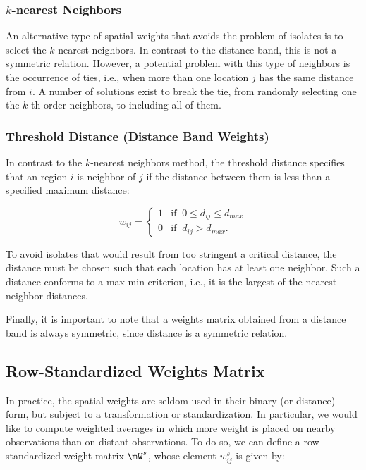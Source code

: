 \subsubsection{$k$-nearest Neighbors}

An alternative type of spatial weights that avoids the problem of isolates is to select the $k$-nearest neighbors. In contrast to the distance band, this is not a symmetric relation. However, a potential problem with this type of neighbors is the occurrence of ties, i.e., when more than one location $j$ has the same distance from $i$. A number of solutions exist to break the tie, from randomly selecting one the $k$-th order neighbors, to including all of them. 

\subsubsection{Threshold Distance (Distance Band Weights)}

In contrast to the $k$-nearest neighbors method, the threshold distance specifies that an region $i$ is neighbor of $j$ if the distance between them is less than a specified maximum distance:


\begin{equation*}
  w_{ij}= 
   \begin{cases}
      1 & \mbox{if}\;\; 0\leq d_{ij} \leq d_{max} \\ 
      0 & \mbox{if}\;\; d_{ij} > d_{max}.
   \end{cases}
\end{equation*}


To avoid isolates that would result from too stringent a critical distance, the distance must be chosen such that each location has at least one neighbor. Such a distance conforms to a max-min criterion, i.e., it is the largest of the nearest neighbor distances.

Finally, it is important to note that a weights matrix obtained from a distance band is always symmetric, since distance is a symmetric relation. 

\subsection{Row-Standardized Weights Matrix}

In practice, the spatial weights are seldom used in their binary (or distance) form, but subject to a transformation or standardization. In particular, we would like to compute weighted averages in which more weight is placed on nearby observations than on distant observations. To do so, we can define a row-standardized weight matrix $\mW^s$, whose element $w_{ij}^s$ is given by:

